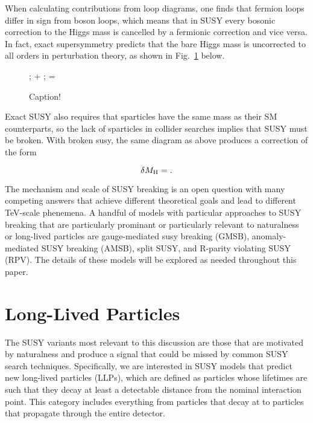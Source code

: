 \documentclass[12pt]{article}
\begin{document}
    When calculating contributions from loop diagrams, one finds that fermion loops differ in sign from boson loops, which means that in SUSY every bosonic correction to the Higgs mass is cancelled by a fermionic correction and vice versa. In fact, exact supersymmetry predicts that the bare Higgs mass is uncorrected to all orders in perturbation theory, as shown in Fig.~\ref{exact_susy_correction} below.
    
    \noindent \begin{figure}[htbp] \begin{center}
        ;
    \quad + \quad
    ;
    \quad =  \quad
    \caption{Caption!}
    \label{exact_susy_correction}
    \end{center} \end{figure}

    Exact SUSY also requires that sparticles have the same mass as their SM counterparts, so the lack of sparticles in collider searches implies that SUSY must be broken. With broken susy, the same diagram as above produces a correction of the form

    \noindent \begin{equation}
    \delta M_{\mathrm{H}} = .
    \label{higgs_susy_correction}
    \end{equation}  
    
    The mechanism and scale of SUSY breaking is an open question with many competing answers that achieve different theoretical goals and lead to different TeV-scale phenemena. A handful of models with particular approaches to SUSY breaking that are particularly prominant or particularly relevant to naturalness or long-lived particles are gauge-mediated susy breaking (GMSB), anomaly-mediated SUSY breaking (AMSB), split SUSY, and R-parity violating SUSY (RPV). The details of these models will be explored as needed throughout this paper.

\section{Long-Lived Particles}
    The SUSY variants most relevant to this discussion are those that are motivated by naturalness and  produce a signal that could be missed by common SUSY search techniques. Specifically, we are interested in SUSY models that predict new long-lived particles (LLPs), which are defined as particles whose lifetimes are such that they decay at least a detectable distance from the nominal interaction point. This category includes everything from particles that decay at  to particles that propagate through the entire detector. 
\end{document}
